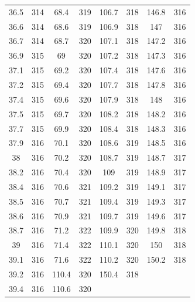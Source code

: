 \documentclass[12pt]{ctexart}
\numberwithin{equation}{section}
\begin{document}
\begin{longtable}{cc|cc|cc|cc}
36.5  &  314  &  68.4  &  319  &  106.7  &  318  &  146.8  &  316  \\
36.6  &  314  &  68.6  &  319  &  106.9  &  318  &  147  &  316  \\
36.7  &  314  &  68.7  &  320  &  107.1  &  318  &  147.2  &  316  \\
36.9  &  315  &  69  &  320  &  107.2  &  318  &  147.3  &  316  \\
37.1  &  315  &  69.2  &  320  &  107.4  &  318  &  147.6  &  316  \\
37.2  &  315  &  69.4  &  320  &  107.7  &  318  &  147.8  &  316  \\
37.4  &  315  &  69.6  &  320  &  107.9  &  318  &  148  &  316  \\
37.5  &  315  &  69.7  &  320  &  108.2  &  318  &  148.2  &  316  \\
37.7  &  315  &  69.9  &  320  &  108.4  &  318  &  148.3  &  316  \\
37.9  &  316  &  70.1  &  320  &  108.6  &  319  &  148.5  &  316  \\
38  &  316  &  70.2  &  320  &  108.7  &  319  &  148.7  &  317  \\
38.2  &  316  &  70.4  &  320  &  109  &  319  &  148.9  &  317  \\
38.4  &  316  &  70.6  &  321  &  109.2  &  319  &  149.1  &  317  \\
38.5  &  316  &  70.7  &  321  &  109.4  &  319  &  149.3  &  317  \\
38.6  &  316  &  70.9  &  321  &  109.7  &  319  &  149.6  &  317  \\
38.7  &  316  &  71.2  &  322  &  109.9  &  320  &  149.8  &  318  \\
39  &  316  &  71.4  &  322  &  110.1  &  320  &  150  &  318  \\
39.1  &  316  &  71.6  &  322  &  110.2  &  320  &  150.2  &  318  \\
39.2  &  316  &  110.4  &  320  &  150.4  &  318  \\
39.4  &  316  &  110.6  &  320  \\

\end{longtable}
\end{document}
